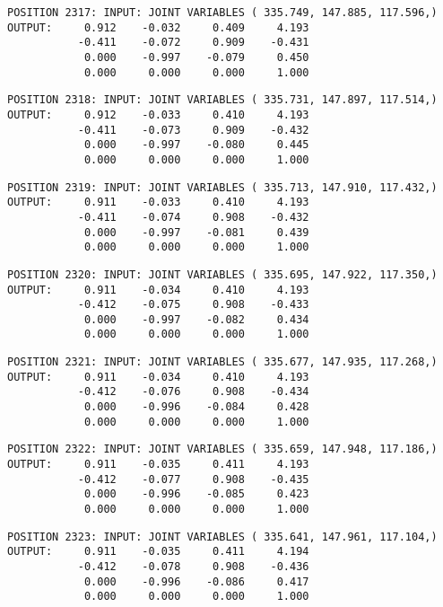 \begin{verbatim}
POSITION 2317: INPUT: JOINT VARIABLES ( 335.749, 147.885, 117.596,)
OUTPUT:     0.912    -0.032     0.409     4.193
           -0.411    -0.072     0.909    -0.431
            0.000    -0.997    -0.079     0.450
            0.000     0.000     0.000     1.000
\end{verbatim} \pagebreak[1]\begin{verbatim}
POSITION 2318: INPUT: JOINT VARIABLES ( 335.731, 147.897, 117.514,)
OUTPUT:     0.912    -0.033     0.410     4.193
           -0.411    -0.073     0.909    -0.432
            0.000    -0.997    -0.080     0.445
            0.000     0.000     0.000     1.000
\end{verbatim} \pagebreak[1]\begin{verbatim}
POSITION 2319: INPUT: JOINT VARIABLES ( 335.713, 147.910, 117.432,)
OUTPUT:     0.911    -0.033     0.410     4.193
           -0.411    -0.074     0.908    -0.432
            0.000    -0.997    -0.081     0.439
            0.000     0.000     0.000     1.000
\end{verbatim} \pagebreak[1]\begin{verbatim}
POSITION 2320: INPUT: JOINT VARIABLES ( 335.695, 147.922, 117.350,)
OUTPUT:     0.911    -0.034     0.410     4.193
           -0.412    -0.075     0.908    -0.433
            0.000    -0.997    -0.082     0.434
            0.000     0.000     0.000     1.000
\end{verbatim} \pagebreak[1]\begin{verbatim}
POSITION 2321: INPUT: JOINT VARIABLES ( 335.677, 147.935, 117.268,)
OUTPUT:     0.911    -0.034     0.410     4.193
           -0.412    -0.076     0.908    -0.434
            0.000    -0.996    -0.084     0.428
            0.000     0.000     0.000     1.000
\end{verbatim} \pagebreak[1]\begin{verbatim}
POSITION 2322: INPUT: JOINT VARIABLES ( 335.659, 147.948, 117.186,)
OUTPUT:     0.911    -0.035     0.411     4.193
           -0.412    -0.077     0.908    -0.435
            0.000    -0.996    -0.085     0.423
            0.000     0.000     0.000     1.000
\end{verbatim} \pagebreak[1]\begin{verbatim}
POSITION 2323: INPUT: JOINT VARIABLES ( 335.641, 147.961, 117.104,)
OUTPUT:     0.911    -0.035     0.411     4.194
           -0.412    -0.078     0.908    -0.436
            0.000    -0.996    -0.086     0.417
            0.000     0.000     0.000     1.000
\end{verbatim} \pagebreak[1]\begin{verbatim}

\end{verbatim}
